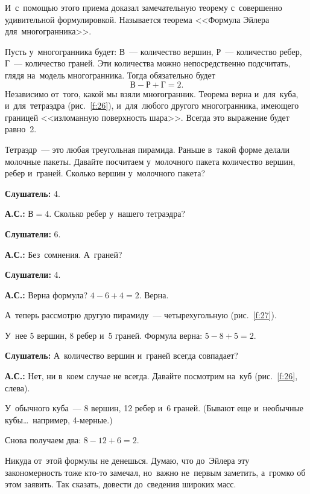 
И~с~помощью этого приема доказал замечательную теорему с~совершенно удивительной формулировкой.
Называется теорема <<Формула Эйлера для~многогранника>>.

Пусть у~многогранника будет:
$\text{В}$~--- количество вершин, $\text{Р}$~--- количество ребер, $\text{Г}$~--- количество граней.
Эти количества можно непосредственно подсчитать, глядя на~модель многогранника.
Тогда обязательно будет
$$
\text{В}-\text{Р}+\text{Г}=2.
$$
Независимо от~того, какой мы взяли многогранник. Теорема верна и~для~куба, и~для~тетраэдра
(рис.~\ref{f:26}), и~для~любого другого многогранника, имеющего границей <<изломанную поверхность шара>>.
Всегда это выражение будет равно~2.



Тетраэдр~--- это любая треугольная пирамида. Раньше в~такой форме делали молочные пакеты. Давайте
посчитаем у~молочного пакета количество вершин, ребер и~граней.
Сколько вершин у~молочного пакета?

\textbf{Слушатель:} 4.

\textbf{А.С.:} $\text{В}=4$. Сколько ребер у~нашего тетраэдра?

\textbf{Слушатели:} 6.

\textbf{А.С.:} Без~сомнения. А~граней?

\textbf{Слушатели:} 4.

\textbf{А.С.:} Верна формула? $4-6+4=2$. Верна.

А~теперь рассмотрю другую пирамиду~--- четырехугольную (рис.~\ref{f:27}).


У~нее 5 вершин, 8 ребер и~5 граней. Формула верна: $5-8+5=2$.

\textbf{Слушатель:} А~количество вершин и~граней всегда совпадает?

\textbf{А.С.:} Нет, ни в~коем случае не всегда.
Давайте посмотрим на~куб (рис.~\ref{f:26}, слева).

У~обычного куба~--- 8 вершин, 12 ребер и~6 граней. (Бывают еще и~необычные кубы\ldots\ например, 4-мерные.)

Снова получаем два: $8-12+6=2$.

Никуда от~этой формулы не денешься. Думаю, что до~Эйлера эту закономерность тоже кто-то замечал,
но~важно не~первым заметить, а~громко об этом заявить. Так сказать, довести до~сведения широких
масс.

